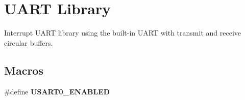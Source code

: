 \hypertarget{group__avr-uart}{\section{U\-A\-R\-T Library}
\label{group__avr-uart}
}


Interrupt U\-A\-R\-T library using the built-\/in U\-A\-R\-T with transmit and receive circular buffers.  


\subsection*{Macros}
\begin{DoxyCompactItemize}
\item 
\hypertarget{group__avr-uart_ga610107710886611e83a969b670164787}{\#define {\bfseries U\-S\-A\-R\-T0\-\_\-\-E\-N\-A\-B\-L\-E\-D}}\label{group__avr-uart_ga610107710886611e83a969b670164787}


\end{DoxyCompactItemize}
